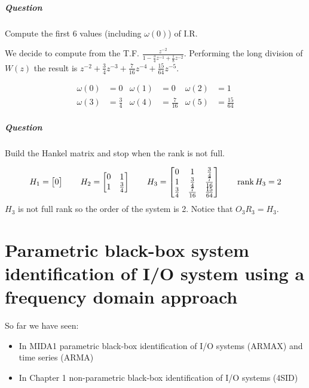 \begin{exercise}
    \paragraph{Question} Compute the first 6 values (including $\omega(0)$) of I.R.

    We decide to compute from the T.F. $\frac{z^{-2}}{1-\frac{3}{4}z^{-1}+\frac{1}{8}z^{-2}}$.
    Performing the long division of $W(z)$ the result is $z^{-2}+\frac{3}{4}z^{-3}+\frac{7}{16}z^{-4}+\frac{15}{64}z^{-5}$.

    \begin{align*}
        \omega(0) &= 0 &
        \omega(1) &= 0 &
        \omega(2) &= 1 \\
        \omega(3) &= \frac{3}{4} &
        \omega(4) &= \frac{7}{16} &
        \omega(5) &= \frac{15}{64}
    \end{align*}

    \paragraph{Question} Build the Hankel matrix and stop when the rank is not full.

    \[
        H_1 = \begin{bmatrix}
            0
        \end{bmatrix}
        \qquad
        H_2 = \begin{bmatrix}
            0 & 1 \\
            1 & \frac{3}{4}
        \end{bmatrix}
        \qquad
        H_3 = \begin{bmatrix}
            0 & 1 & \frac{3}{4} \\
            1 & \frac{3}{4} & \frac{7}{16} \\
            \frac{3}{4} & \frac{7}{16} & \frac{15}{64}
        \end{bmatrix}
        \qquad
        \operatorname*{rank} H_3 = 2
    \]
    $H_3$ is not full rank so the order of the system is 2. Notice that $O_3R_3 = H_3$.
\end{exercise}

\chapter{Parametric black-box system identification of I/O system using a frequency domain approach}

So far we have seen:
\begin{itemize}
    \item In MIDA1 parametric black-box identification of I/O systems (ARMAX) and time series (ARMA)
    \item In Chapter 1 non-parametric black-box identification of I/O systems (4SID)
\end{itemize}

